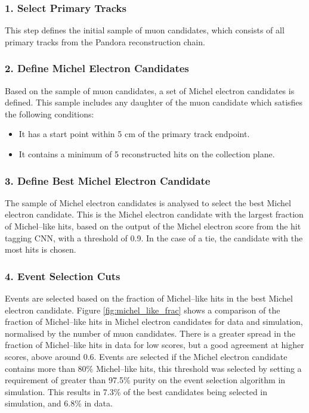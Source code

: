 \subsubsection*{1. Select Primary Tracks}
This step defines the initial sample of muon candidates, which consists of all
primary tracks from the Pandora reconstruction chain.

\subsubsection*{2. Define Michel Electron Candidates}
Based on the sample of muon candidates, a set of Michel electron candidates is
defined. This sample includes any daughter of the muon candidate which satisfies
the following conditions:
\begin{itemize}
	\item It has a start point within 5 cm of the primary track endpoint.
	\item It contains a minimum of 5 reconstructed hits on the collection plane.
\end{itemize}

\subsubsection*{3. Define Best Michel Electron Candidate}
The sample of Michel electron candidates is analysed to select the best Michel
electron candidate. This is the Michel electron candidate with the largest
fraction of Michel--like hits, based on the output of the Michel electron score
from the hit tagging CNN, with a threshold of 0.9. In the case of a tie, the 
candidate with the most hits is chosen.

\subsubsection*{4. Event Selection Cuts}
Events are selected based on the fraction of Michel--like hits in the best 
Michel electron candidate. Figure \ref{fig:michel_like_frac} shows a comparison 
of the fraction of Michel--like hits in Michel electron candidates for 
\protodune{} data and simulation, normalised by the number of muon candidates. 
There is a greater spread in the fraction of Michel--like hits in 
data for low scores, but a good agreement at higher scores, above around 0.6. 
Events are selected if the Michel electron candidate contains more than 80\% 
Michel--like hits, this threshold was selected by setting a requirement of 
greater than 97.5\% purity on the event selection algorithm in simulation. This 
results in 7.3\% of the best candidates being selected in simulation, and 6.8\% 
in data.

